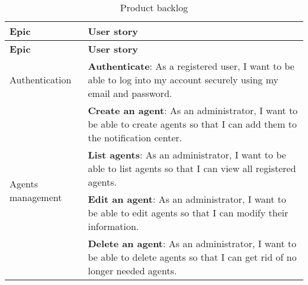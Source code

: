 \begin{longtable}{ | m{}  | m{} | }
      \caption{Product backlog} \label{tab-backlog}                                                                                                                                                                                                           \\
      \hline
      \textbf{Epic}                                           & \textbf{User story}                                                                                                                                                                           \\
      \hline
      \endfirsthead
      \hline
      \textbf{Epic}                                           & \textbf{User story}                                                                                                                                                                           \\
      \hline
      \endhead
      \hline
      \endfoot
      \endlastfoot
      Authentication                                          & \textbf{Authenticate}: As a registered user, I want to be able to log into my account securely using my email and password.                                                                   \\
      \hline
      \multirow[t]{4}{5em}{Agents management}                 & \textbf{Create an agent}: As an administrator, I want to be able to create agents so that I can add them to the notification center.                                                          \\
      \cline{2-2}
                                                              & \textbf{List agents}: As an administrator, I want to be able to list agents so that I can view all registered agents.                                                                         \\
      \cline{2-2}
                                                              & \textbf{Edit an agent}: As an administrator, I want to be able to edit agents so that I can modify their information.                                                                         \\
      \cline{2-2}
                                                              & \textbf{Delete an agent}: As an administrator, I want to be able to delete agents so that I can get rid of no longer needed agents.                                                           \\

\end{longtable}
